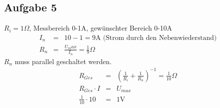 \documentclass[12pt,a4paper]{article}
\begin{document}
\subsection*{Aufgabe 5}
$R_i = 1\Omega$, Messbereich 0-1A, gew\"unschter Bereich 0-10A
\begin{eqnarray*}
I_n & = & 10 - 1 = 9\mbox{A (Strom durch den Nebenwiederstand)} \\
R_n & = & \frac{U_max}{I_n} = \frac{1}{9}  \Omega
\end{eqnarray*}
$R_n$ muss parallel geschaltet werden.
\begin{eqnarray*}
R_{Ges} & = & \left( \frac{1}{R_i} + \frac{1}{R_n} \right) ^{-1} = \frac{1}{10}\Omega \\
R_{Ges} \cdot I & = & U_{max} \\
\frac{1}{10} \cdot 10 & = & 1 \mbox{V}
\end{eqnarray*}
\end{document}
